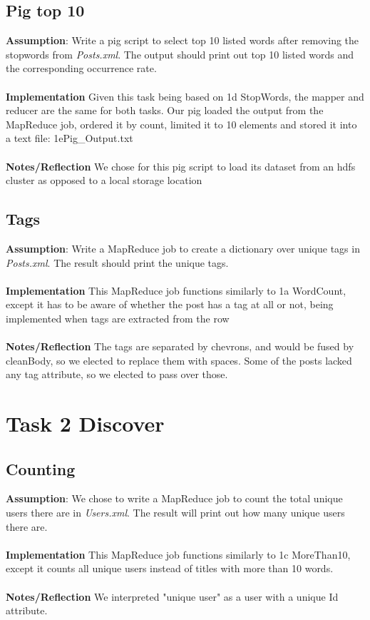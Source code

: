 \documentclass[fleqn,10pt]{wlscirep}
\begin{document}
\subsection{Pig top 10}
\textbf{Assumption}: Write a pig script to select top 10 listed words after removing the stopwords from \textit{Posts.xml}. The output should print out top 10 listed words and the corresponding occurrence rate.\\ \\
\textbf{Implementation} Given this task being based on 1d StopWords, the mapper and reducer are the same for both tasks. Our pig loaded the output from the MapReduce job, ordered it by count, limited it to 10 elements and stored it into a text file: 1ePig_Output.txt \\ \\
\textbf{Notes/Reflection} We chose for this pig script to load its dataset from an hdfs cluster as opposed to a local storage location


\subsection{Tags}
\textbf{Assumption}: Write a MapReduce job to create a dictionary over unique tags in  \textit{Posts.xml}. The result should print the unique tags.\\ \\
\textbf{Implementation} This MapReduce job functions similarly to 1a WordCount, except it has to be aware of whether the post has a tag at all or not, being implemented when tags are extracted from the row \\ \\
\textbf{Notes/Reflection} The tags are separated by chevrons, and would be fused by cleanBody, so we elected to replace them with spaces. Some of the posts lacked any tag attribute, so we elected to pass over those.



\section{Task 2 Discover}

\subsection{Counting}
\textbf{Assumption}: We chose to write a MapReduce job to count the total unique users there are in \textit{Users.xml}. The result will print out how many unique users there are.\\ \\
\textbf{Implementation} This MapReduce job functions similarly to 1c MoreThan10, except it counts all unique users instead of titles with more than 10 words. \\ \\
\textbf{Notes/Reflection} We interpreted "unique user" as a user with a unique Id attribute.

\end{document}
